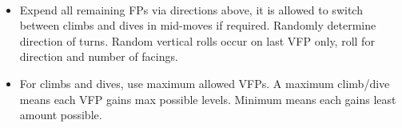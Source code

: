 \begin{TABLE}
\medskip

\begin{tablenote}{\linewidth}
\\
\begin{itemize}
    \item Expend all remaining FPs via directions above, it is allowed to switch between climbs and dives in mid-moves if required. Randomly determine direction of turns. Random vertical rolls occur on last VFP only, roll for direction and number of facings.
    \item For climbs and dives, use maximum allowed VFPs. A maximum climb/dive means each VFP gains max possible levels. Minimum means each gains least amount possible.
\end{itemize}
\end{tablenote}
\end{TABLE}
